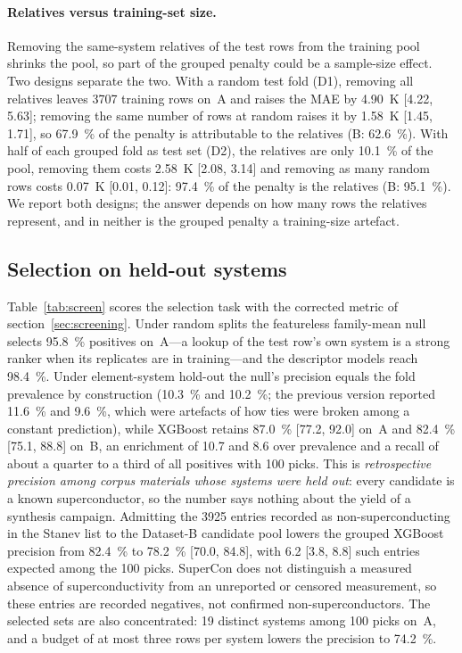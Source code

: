 \documentclass{iopjournal}
\newcommand{\ci}[2]{[\num{#1}, \num{#2}]}
\begin{document}
\paragraph{Relatives versus training-set size.} Removing the same-system relatives of the test rows
from the training pool shrinks the pool, so part of the grouped penalty could be a sample-size
effect. Two designs separate the two. With a random test fold (D1), removing all relatives leaves
\num{3707} training rows on~A and raises the MAE by \SI{4.90}{\kelvin} \ci{4.22}{5.63}; removing
the same number of rows at random raises it by \SI{1.58}{\kelvin} \ci{1.45}{1.71}, so
\SI{67.9}{\percent} of the penalty is attributable to the relatives (B: \SI{62.6}{\percent}). With
half of each grouped fold as test set (D2), the relatives are only \SI{10.1}{\percent} of the pool,
removing them costs \SI{2.58}{\kelvin} \ci{2.08}{3.14} and removing as many random rows costs
\SI{0.07}{\kelvin} \ci{0.01}{0.12}: \SI{97.4}{\percent} of the penalty is the relatives (B:
\SI{95.1}{\percent}). We report both designs; the answer depends on how many rows the relatives
represent, and in neither is the grouped penalty a training-size artefact.

\subsection{Selection on held-out systems}
\label{sec:results-screening}

Table~\ref{tab:screen} scores the selection task with the corrected metric of
section~\ref{sec:screening}. Under random splits the featureless family-mean null selects
\SI{95.8}{\percent} positives on~A---a lookup of the test row's own system is a strong ranker when
its replicates are in training---and the descriptor models reach \SI{98.4}{\percent}. Under
element-system hold-out the null's precision equals the fold prevalence by construction
(\SI{10.3}{\percent} and \SI{10.2}{\percent}; the previous version reported \SI{11.6}{\percent} and
\SI{9.6}{\percent}, which were artefacts of how ties were broken among a constant prediction), while
XGBoost retains \SI{87.0}{\percent} \ci{77.2}{92.0} on~A and \SI{82.4}{\percent} \ci{75.1}{88.8}
on~B, an enrichment of \num{10.7} and \num{8.6} over prevalence and a recall of about a quarter
to a third of all positives with \num{100} picks. This is \emph{retrospective precision among corpus
materials whose systems were held out}: every candidate is a known superconductor, so the number
says nothing about the yield of a synthesis campaign. Admitting the \num{3925} entries recorded as non-superconducting in the Stanev list to the Dataset-B candidate pool lowers the grouped XGBoost
precision from \SI{82.4}{\percent} to \SI{78.2}{\percent} \ci{70.0}{84.8}, with \num{6.2}
\ci{3.8}{8.8} such entries expected among the \num{100} picks. SuperCon does not distinguish a measured absence of superconductivity from an unreported or censored measurement, so these entries are recorded negatives, not confirmed non-superconductors. The selected sets are also
concentrated: \num{19} distinct systems among \num{100} picks on~A, and a budget of at most three
rows per system lowers the precision to \SI{74.2}{\percent}.
\end{document}
